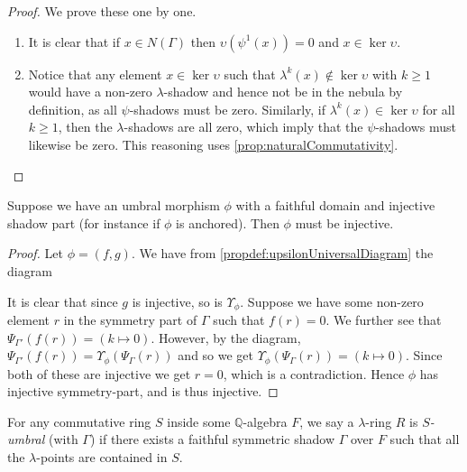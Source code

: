 \begin{proof}
  We prove these one by one.
  \begin{enumerate}
    \item It is clear that if $x \in N(\Gamma)$ then $\upsilon(\psi^1(x)) = 0$ and $x \in \ker \upsilon$.
    \item Notice that any element $x \in \ker \upsilon$ such that $\lambda^k(x) \notin \ker \upsilon$ with $k \ge 1$ would have a non-zero $\lambda$-shadow and hence not be in the nebula by definition, as all $\psi$-shadows must be zero. Similarly, if $\lambda^k(x) \in \ker \upsilon$ for all $k \ge 1$, then the $\lambda$-shadows are all zero, which imply that the $\psi$-shadows must likewise be zero. This reasoning  uses \ref{prop:naturalCommutativity}.
  \end{enumerate}
\end{proof}

\begin{proposition}
  Suppose we have an umbral morphism $\phi$ with a faithful domain and injective shadow part (for instance if $\phi$ is anchored). Then $\phi$ must be injective. 
\end{proposition}

\begin{proof}
  Let $\phi = (f, g)$. We have from \ref{propdef:upsilonUniversalDiagram} the diagram
  \begin{center}
  \end{center}
  It is clear that since $g$ is injective, so is $\Upsilon_{\phi}$. Suppose we have some non-zero element $r$ in the symmetry part of $\Gamma$ such that $f(r) = 0$. We further see that $\Psi_{\Gamma'}(f(r)) = (k \mapsto 0)$. However, by the diagram, $\Psi_{\Gamma'}(f(r)) = \Upsilon_\phi(\Psi_{\Gamma}(r))$ and so we get $\Upsilon_\phi(\Psi_{\Gamma}(r)) = (k \mapsto 0)$. Since both of these are injective we get $r = 0$, which is a contradiction. Hence $\phi$ has injective symmetry-part, and is thus injective. \qedhere
\end{proof}

\begin{definition}
  For any commutative ring $S$ inside some $\mathbb{Q}$-algebra $F$, we say a $\lambda$-ring $R$ is \emph{$S$-umbral} (with $\Gamma$) if there exists a faithful symmetric shadow $\Gamma$ over $F$ such that all the $\lambda$-points are contained in $S$. 
\end{definition}

